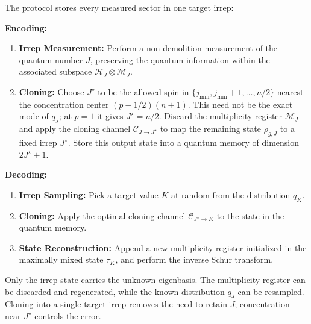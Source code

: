 \documentclass[a4paper,onecolumn,11pt]{quantumarticle}
\def\h{\mathcal{H}}
\def\C{\mathcal{C}}
\def\map{\mathcal}
\begin{document}
The protocol stores every measured sector in one target irrep:
\begin{tcolorbox}[colback=gray!5!white, colframe=gray!100!black, title=Qubit Compression Scheme (YCH~\cite{yang2016optimal})]
\textbf{Encoding:}
\begin{enumerate}
    \item \textbf{Irrep Measurement:} Perform a non-demolition measurement of the quantum number $J$, preserving the quantum information within the associated subspace $\h_J \otimes \map{M}_J$. 
    \item \textbf{Cloning:} Choose $J^\star$ to be the allowed spin in $\{j_{\min},j_{\min}+1,\ldots,n/2\}$ nearest the concentration center $(p-1/2)(n+1)$. This need not be the exact mode of $q_J$; at $p=1$ it gives $J^\star=n/2$. Discard the multiplicity register $\map{M}_J$ and apply the cloning channel $\C_{J\to J^\star}$ to map the remaining state $\rho_{g,J}$ to a fixed irrep $J^\star$. Store this output state into a quantum memory of dimension $2J^\star + 1$.
\end{enumerate}

\textbf{Decoding:}
\begin{enumerate}
    \item \textbf{Irrep Sampling:} Pick a target value $K$ at random from the distribution $q_K$.
    \item \textbf{Cloning:} Apply the optimal cloning channel $\mathcal{C}_{J^\star\to K}$ to the state in the quantum memory.
    \item \textbf{State Reconstruction:} Append a new multiplicity register initialized in the maximally mixed state $\tau_K$, and perform the inverse Schur transform.
\end{enumerate}
\end{tcolorbox}

Only the irrep state carries the unknown eigenbasis. The multiplicity
register can be discarded and regenerated, while the known distribution
$q_J$ can be resampled. Cloning into a single target irrep removes the
need to retain $J$; concentration near $J^\star$ controls the error.
\end{document}
